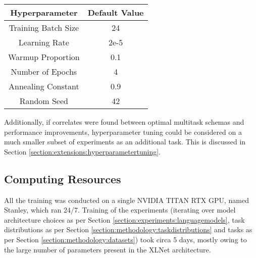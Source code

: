 \begin{center}
	\begin{tabular}{||c | c||} 
		\hline
		Hyperparameter & Default Value  \\ [0.5ex] 
		\hline\hline
		Training Batch Size & 24 \\ 
		\hline
		Learning Rate & 2e-5  \\
		\hline
		Warmup Proportion & 0.1  \\
		\hline
		Number of Epochs & 4  \\
		\hline
		Annealing Constant & 0.9  \\
		\hline
		Random Seed & 42  \\
		\hline
	\end{tabular}
	\label{table:experiments:hyperparameters}
\end{center}

Additionally, if correlates were found between optimal multitask schemas and performance improvements, hyperparameter tuning could be considered on a much smaller subset of experiments as an additional task. This is discussed in Section \ref{section:extensions:hyperparametertuning}.

\subsection{Computing Resources} \label{section:experiments:compute}
All the training was conducted on a single NVIDIA TITAN RTX GPU, named Stanley, which ran 24/7. Training of the experiments (iterating over model architecture choices as per Section \ref{section:experiments:languagemodels}, task distributions as per Section \ref{section:methodology:taskdistributions} and tasks as per Section \ref{section:methodology:datasets}) took circa 5 days, mostly owing to the large number of parameters present in the XLNet architecture.


